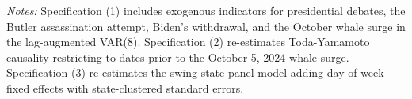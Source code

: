 \begin{table}[htbp]
\centering
\small
\caption{Robustness and Falsification Battery}
\label{tab:robustness}
\begin{minipage}{0.95\textwidth}
\vspace{1ex}
\footnotesize
\textit{Notes:} Specification (1) includes exogenous indicators for presidential debates, the Butler assassination attempt, Biden's withdrawal, and the October whale surge in the lag-augmented VAR(8). Specification (2) re-estimates Toda-Yamamoto causality restricting to dates prior to the October 5, 2024 whale surge. Specification (3) re-estimates the swing state panel model adding day-of-week fixed effects with state-clustered standard errors.
\end{minipage}
\end{table}
